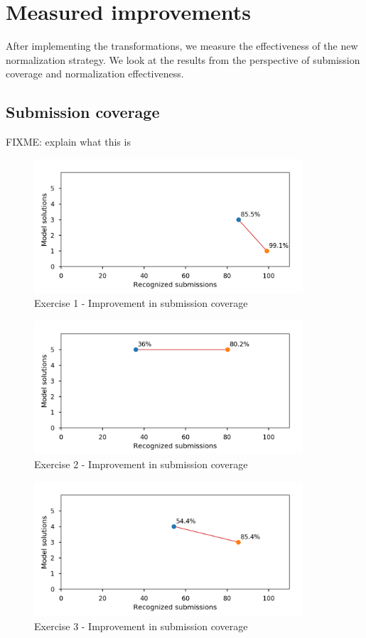 \chapter{Measured improvements}
\label{sec:improvements}

After implementing the transformations, we measure the effectiveness of the new normalization strategy. We look at the results from the perspective of submission coverage and normalization effectiveness.

\section{Submission coverage}

FIXME: explain what this is


\begin{figure}
\centering
\includegraphics[height=5cm]{graphs/coverage-1.png}
\caption{Exercise 1 - Improvement in submission coverage}
\label{fig:improvements-coverage-1}
\end{figure}

\begin{figure}
\centering
\includegraphics[height=5cm]{graphs/coverage-2.png}
\caption{Exercise 2 - Improvement in submission coverage}
\label{fig:improvements-coverage-2}
\end{figure}

\begin{figure}
\centering
\includegraphics[height=5cm]{graphs/coverage-3.png}
\caption{Exercise 3 - Improvement in submission coverage}
\label{fig:improvements-coverage-3}
\end{figure}

